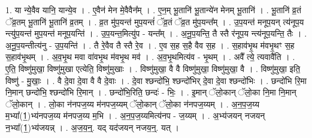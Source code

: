 \documentclass[17pt]{extarticle}
\begin{document}
1. या न्ये॒वैव यानि॒ यान्ये॒व । . ए॒वैन॑ मेन मे॒वैवैन᳚म् । . ए॒न॒म् भू॒तानि॑ भू॒तान्ये॑न मेनम् भू॒तानि॑ । . भू॒तानि॑ व्र॒तं ॅव्र॒तम् भू॒तानि॑ भू॒तानि॑ व्र॒तम् । . व्र॒त मु॑प॒यन्त॑ मुप॒यन्तं॑ ॅव्र॒तं ॅव्र॒त मु॑प॒यन्त᳚म् । . उ॒प॒यन्त॑ मनूप॒यन् त्य॑नूप॒य न्त्यु॑प॒यन्त॑ मुप॒यन्त॑ मनूप॒यन्ति॑ । . उ॒प॒यन्त॒मित्यु॑प - यन्त᳚म् । . अ॒नू॒प॒यन्ति॒ तै स्तै र॑नूप॒य न्त्य॑नूप॒यन्ति॒ तैः । . अ॒नू॒प॒यन्तीत्य॑नु - उ॒प॒यन्ति॑ । . तै रे॒वैव तै स्तै रे॒व । . ए॒व स॒ह स॒है वैव स॒ह । . स॒हाव॑भृ॒थ म॑वभृ॒थꣳ स॒ह स॒हाव॑भृ॒थम् । . अ॒व॒भृ॒थ मवा वा॑वभृ॒थ म॑वभृ॒थ मव॑ । . अ॒व॒भृ॒थमित्य॑व - भृ॒थम् । . अवै᳚ त्ये॒ त्यवावै॑ति । . ए॒ति॒ विष्णु॑मुखा॒ विष्णु॑मुखा एत्येति॒ विष्णु॑मुखाः । . विष्णु॑मुखा॒ वै वै विष्णु॑मुखा॒ विष्णु॑मुखा॒ वै । . विष्णु॑मुखा॒ इति॒ विष्णु॑ - मु॒खाः॒ । . वै दे॒वा दे॒वा वै वै दे॒वाः । . दे॒वा श्छन्दो॑भि॒ श्छन्दो॑भिर् दे॒वा दे॒वा श्छन्दो॑भिः । . छन्दो॑भि रि॒मा नि॒मान् छन्दो॑भि॒ श्छन्दो॑भि रि॒मान् । . छन्दो॑भि॒रिति॒ छन्दः॑ - भिः॒ । . इ॒मान् ॅलो॒कान् ॅलो॒का नि॒मा नि॒मान् ॅलो॒कान् । . लो॒का न॑नपज॒य्य म॑नपज॒य्यम् ॅलो॒कान् ॅलो॒का न॑नपज॒य्यम् । . अ॒न॒प॒ज॒य्य म॒भ्या᳚(1॒)भ्य॑नपज॒य्य म॑नपज॒य्य म॒भि । . अ॒न॒प॒ज॒य्यमित्य॑नप - ज॒य्यम् । . अ॒भ्य॑जयन् नजयन् न॒भ्या᳚(1॒)भ्य॑जयन्न् । . अ॒ज॒य॒न्॒. यद् यद॑जयन् नजय॒न्॒. यत् । \newline
\end{document}
